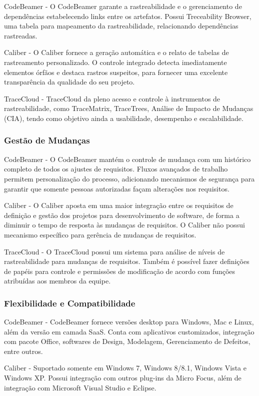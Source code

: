 CodeBeamer - O CodeBeamer garante a rastreabilidade e o gerenciamento de dependências estabelecendo links entre os artefatos. Possui Treceability Browser, uma tabela para mapeamento da rastreabilidade, relacionando dependências rastreadas.

Caliber - O Caliber fornece a geração automática e o relato de tabelas de rastreamento personalizado. O controle integrado detecta imediatamente elementos órfãos e destaca rastros suspeitos, para fornecer uma excelente transparência da qualidade do seu projeto.

TraceCloud - TraceCloud da pleno acesso e controle à instrumentos de rastreabilidade, como TraceMatrix, TraceTrees, Análise de Impacto de Mudanças (CIA), tendo como objetivo ainda a usabilidade, desempenho e escalabilidade.

\subsubsection{Gestão de Mudanças}

CodeBeamer - O CodeBeamer mantém o controle de mudança com um histórico completo de todos os ajustes de requisitos. Fluxos avançados de trabalho permitem personalização do processo, adicionando mecanismos de segurança para garantir que somente pessoas autorizadas façam alterações nos requisitos.

Caliber - O Caliber aposta em uma maior integração entre os requisitos de definição e gestão dos projetos para desenvolvimento de software, de forma a diminuir o tempo de resposta às mudanças de requisitos. O Caliber não possui mecanismo específico para gerência de mudanças de requisitos.

TraceCloud - O TraceCloud possui um sistema para análise de níveis de rastreabilidade para mudanças de requisitos. Também é possível fazer definições de papéis para controle e permissões de modificação de acordo com funções atribuídas aos membros da equipe.

\subsubsection{Flexibilidade e Compatibilidade}

CodeBeamer - CodeBeamer fornece versões desktop para Windows, Mac e Linux, além da versão em camada SaaS. Conta com aplicativos customizados, integração com pacote Office, softwares de Design, Modelagem, Gerenciamento de Defeitos, entre outros.

Caliber - Suportado somente em Windows 7, Windows 8/8.1, Windows Vista e Windows XP. Possui integração com outros plug-ins da Micro Focus, além de integração com Microsoft Visual Studio e Eclipse.

